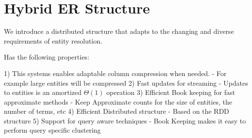 
\section{Hybrid ER Structure}


% 



We introduce a distributed structure that adapts to the changing and diverse requirements 
of entity resolution.

Has the following properties:

1) This systems enables adaptable column compression when needed.
  - For example large entities will be compressed
2) Fast updates for streaming 
  - Updates to entities is an amortized $\Theta(1)$ operation
3) Efficient Book keeping for fast approximate methods
  - Keep Approximate counts for the size of entities, the number of terms, etc
4) Efficient Distributed structure
  - Based on the RDD structure
5) Support for query aware techniques
  - Book Keeping makes it easy to perform query specific clustering



